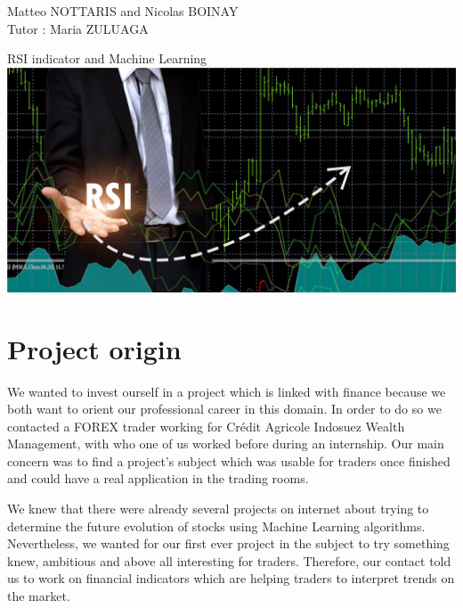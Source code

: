 \documentclass[]{article}
\begin{document}
\begin{titlepage}

\begin{flushleft}
Matteo NOTTARIS and Nicolas BOINAY \\
\bigskip
Tutor : Maria ZULUAGA
\end{flushleft}

\vspace*{\fill}  
\begin{center}  
     {\huge RSI indicator and Machine Learning}\\[30mm]
     \includegraphics[scale=0.35]{image/rsi_bourse.png}
	 \centering
\end{center}
\vspace*{\fill} 

\end{titlepage}

\doublespacing

\renewcommand*\contentsname{Summary}

\tableofcontents
\clearpage
\singlespacing

\section{Project origin}

\vskip 0.5cm
We wanted to invest ourself in a project which is linked with finance because we both want to orient our professional career in this domain.
In order to do so we contacted a FOREX trader working for Crédit Agricole Indosuez Wealth Management, with who one of us worked before during an internship. Our main concern was to find a project's subject which was usable for traders once finished and could have a real application in the trading rooms.

\vskip 0.5cm
We knew that there were already several projects on internet about trying to determine the future evolution of stocks using Machine Learning algorithms. Nevertheless, we wanted for our first ever project in the subject to try something knew, ambitious and above all interesting for traders. Therefore, our contact told us to work on financial indicators which are helping traders to interpret trends on the market.
\end{document}
